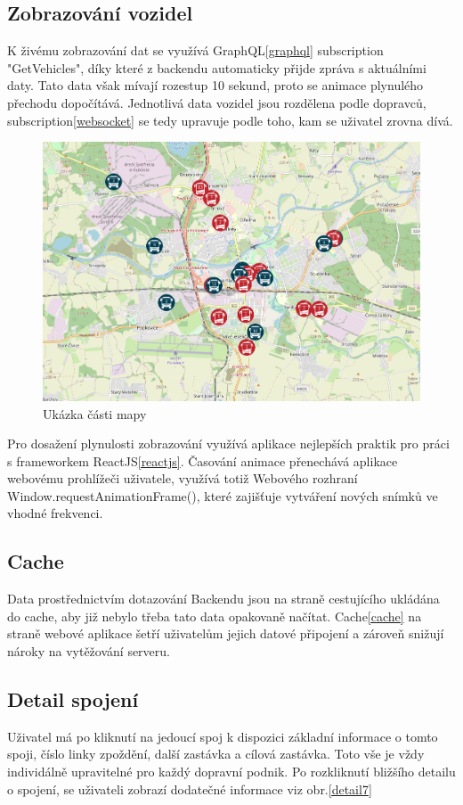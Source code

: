 \subsection{Zobrazování vozidel}
K živému zobrazování dat se využívá GraphQL\ref{graphql} subscription "GetVehicles", díky které z backendu automaticky přijde zpráva s aktuálními daty. Tato data však mívají rozestup 10 sekund, proto se animace plynulého přechodu dopočítává. Jednotlivá data vozidel jsou rozdělena podle dopravců, subscription\ref{websocket} se tedy upravuje podle toho, kam se uživatel zrovna dívá.
\begin{figure}[H]
    \centering
    \includegraphics[width=1\textwidth]{images/Screenshot from 2023-03-18 20-15-00.png}
    \caption{Ukázka části mapy}
    \label{mapa}
\end{figure}

Pro dosažení plynulosti zobrazování využívá aplikace nejlepších praktik pro práci s frameworkem ReactJS\ref{reactjs}. Časování animace přenechává aplikace webovému prohlížeči uživatele, využívá totiž Webového rozhraní Window.requestAnimationFrame()\cite{animationframe}, které zajišťuje vytváření nových snímků ve vhodné frekvenci.
\subsection{Cache}
Data prostřednictvím dotazování Backendu jsou na straně cestujícího ukládána do cache, aby již nebylo třeba tato data opakovaně načítat.
Cache\ref{cache} na straně webové aplikace šetří uživatelům jejich datové připojení a zároveň snižují nároky na vytěžování serveru.

\subsection{Detail spojení}
Uživatel má po kliknutí na jedoucí spoj k dispozici základní informace o tomto spoji, číslo linky zpoždění, další zastávka a cílová zastávka. Toto vše je vždy individálně upravitelné pro každý dopravní podnik. Po rozkliknutí bližšího detailu o spojení, se uživateli zobrazí dodatečné informace viz obr.\ref{detail7}

